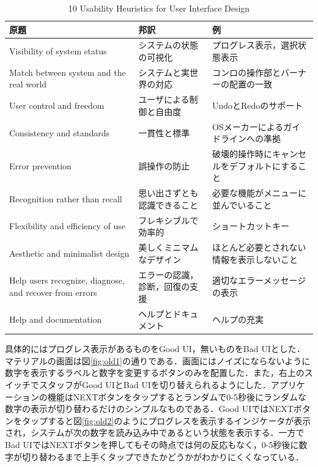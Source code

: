 \begin{landscape}
\begin{table}[]
\begin{tabular}{lll}
\hline
原題                                                      & 邦訳              & 例                       \\ \hline
Visibility of system status                             & システムの状態の可視化     & プログレス表示，選択状態表示          \\
Match between system and the real world                 & システムと実世界の対応     & コンロの操作部とバーナーの配置の一致      \\
User control and freedom                                & ユーザによる制御と自由度    & UndoとRedoのサポート          \\
Consistency and standards                               & 一貫性と標準          & OSメーカーによるガイドラインへの準拠     \\
Error prevention                                        & 誤操作の防止          & 破壊的操作時にキャンセルをデフォルトにすること \\
Recognition rather than recall                          & 思い出さずとも認識できること  & 必要な機能がメニューに並んでいること      \\
Flexibility and efficiency of use                       & フレキシブルで効率的      & ショートカットキー               \\
Aesthetic and minimalist design                         & 美しくミニマムなデザイン    & ほとんど必要とされない情報を表示しないこと   \\
Help users recognize, diagnose, and recover from errors & エラーの認識，診断，回復の支援 & 適切なエラーメッセージの表示          \\
Help and documentation                                  & ヘルプとドキュメント      & ヘルプの充実                  \\ \hline
\end{tabular}
\caption{10 Usability Heuristics for User Interface Design\cite{nngroup}}
\label{table:heuristics}
\end{table}
\end{landscape}

具体的にはプログレス表示があるものをGood UI，無いものをBad UIとした．マテリアルの画面は図\ref{fig:old1}の通りである．画面にはノイズにならないように数字を表示するラベルと数字を変更するボタンのみを配置した．また，右上のスイッチでスタッフがGood UIとBad UIを切り替えられるようにした．アプリケーションの機能はNEXTボタンをタップするとランダムで0-5秒後にランダムな数字の表示が切り替わるだけのシンプルなものである．Good UIではNEXTボタンをタップすると図\ref{fig:old2}のようにプログレスを表示するインジケータが表示され，システムが次の数字を読み込み中であるという状態を表示する．一方でBad UIではNEXTボタンを押してもその時点では何の反応もなく，0-5秒後に数字が切り替わるまで上手くタップできたかどうかがわかりにくくなっている．

